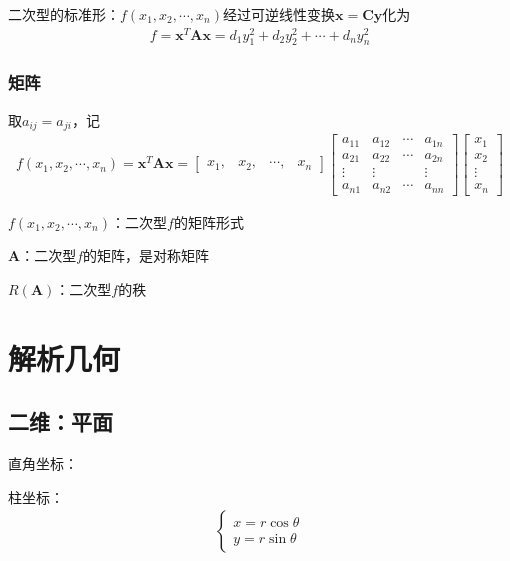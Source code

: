 \documentclass[12pt]{book}
\begin{document}
二次型的标准形：$f(x_1,x_2,\cdots,x_n)$经过可逆线性变换$\bm{x}=\bm{C}\bm{y}$化为
\begin{gather*}
    f=\bm{x}^{T} \bm{A} \bm{x} = d_{1} y_{1}^{2} + d_{2} y_{2}^{2} + \cdots + d_{n} y_{n}^{2}
\end{gather*}




\subsection{矩阵}


取$a_{ij} = a_{ji}$，记
\begin{gather*}
    f(x_1,x_2,\cdots,x_n)=\bm{x}^{T}\bm{A}\bm{x} = 
    \begin{bmatrix}
        x_1,&x_2,&\cdots,&x_n
    \end{bmatrix}
    \begin{bmatrix}
        a_{11} & a_{12} & \cdots & a_{1n} \\
        a_{21} & a_{22} & \cdots & a_{2n} \\
        \vdots & \vdots &        & \vdots \\
        a_{n1} & a_{n2} & \cdots & a_{nn} 
    \end{bmatrix}
    \begin{bmatrix}
        x_1\\x_2\\\vdots\\x_n
    \end{bmatrix}
\end{gather*}
\par $f(x_1,x_2,\cdots,x_n)$：二次型$f$的矩阵形式
\par $\bm{A}$：二次型$f$的矩阵，是对称矩阵
\par $R(\bm{A})$：二次型$f$的秩




\chapter{解析几何}






\section{二维：平面}

直角坐标：

柱坐标：
\begin{gather*}
    \begin{cases}
        x=r \cos{\theta} \\
        y=r \sin{\theta}
    \end{cases}
\end{gather*}
\end{document}
